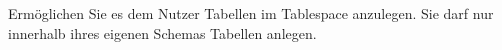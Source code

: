     \item Erm\"oglichen Sie es dem Nutzer  Tabellen im Tablespace  anzulegen. Sie darf nur innerhalb ihres eigenen Schemas Tabellen anlegen.
